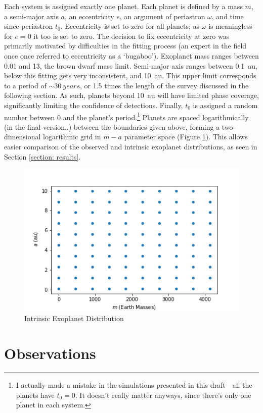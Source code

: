 \documentclass[12pt,manuscript]{aastex}
\begin{document}
Each system is assigned exactly one planet. 
Each planet is defined by a mass $m$, a semi-major axis $a$, an eccentricity $e$, an argument of periastron $\omega$, and time since periastron $t_0$. 
Eccentricity is set to zero for all planets; as $\omega$ is meaningless for $e=0$ it too is set to zero. 
The decision to fix eccentricity at zero was primarily motivated by difficulties in the fitting process (an expert in the field once once referred to eccentricity as a `bugaboo'). 
Exoplanet mass ranges between \SI{0.01}{\Mearth} and \SI{13}{\Mjup}, the brown dwarf mass limit. 
Semi-major axis ranges between \SI{0.1}{au}, below this fitting gets very inconsistent, and \SI{10}{au}. 
This upper limit corresponds to a period of $\sim \SI{30}{years}$, or 1.5 times the length of the survey discussed in the following section. 
As such, planets beyond \SI{10}{au} will have limited phase coverage, significantly limiting the confidence of detections.
Finally, $t_0$ is assigned a random number between 0 and the planet's period.\footnote{I actually made a mistake in the simulations presented in this draft---all the planets have $t_0=0$. It doesn't really matter anyways, since there's only one planet in each system.}
Planets are spaced logarithmically (in the final version..) between the boundaries given above, forming a two-dimensional logarithmic grid in $m-a$ parameter space (Figure \ref{fig: intrinsic_dist}). This allows easier comparison of the observed and intrinsic exoplanet distributions, as seen in Section \ref{section: results}.

\begin{figure}
  \centering
  \includegraphics[width=0.5\linewidth]{../figures/intrinsic_dist}
  \caption{Intrinsic Exoplanet Distribution}
  \label{fig: intrinsic_dist}
\end{figure}


\section{Observations}
\label{section: survey}
\end{document}
